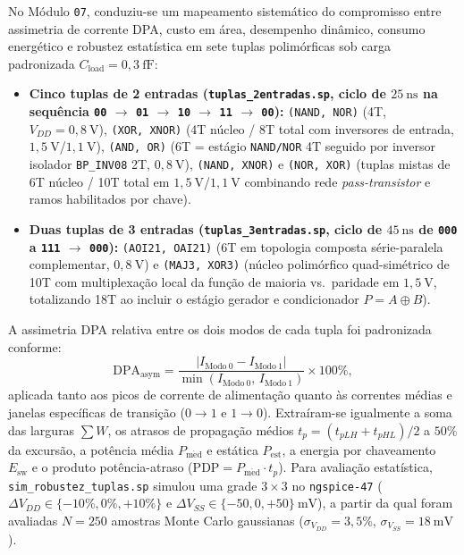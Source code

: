 No M\'{o}dulo \texttt{07}, conduziu-se um mapeamento sistem\'{a}tico do compromisso entre assimetria de corrente DPA, custo em \'{a}rea, desempenho din\^{a}mico, consumo energ\'{e}tico e robustez estat\'{i}stica em sete tuplas polim\'{o}rficas sob carga padronizada $C_{\mathrm{load}} = 0{,}3\ \text{fF}$:
\begin{itemize}
    \item \textbf{Cinco tuplas de 2 entradas (\texttt{tuplas\_\allowbreak 2entradas.sp}, ciclo de $25\ \text{ns}$ na sequ\^{e}ncia \texttt{00} $\to$ \texttt{01} $\to$ \texttt{10} $\to$ \texttt{11} $\to$ \texttt{00}):} \texttt{(NAND, NOR)} (4T, $V_{DD}=0{,}8\ \text{V}$), \texttt{(XOR, XNOR)} (4T n\'{u}cleo / 8T total com inversores de entrada, $1{,}5\ \text{V}$/$1{,}1\ \text{V}$), \texttt{(AND, OR)} (6T = est\'{a}gio \texttt{NAND/NOR} 4T seguido por inversor isolador \texttt{BP\_INV08} 2T, $0{,}8\ \text{V}$), \texttt{(NAND, XNOR)} e \texttt{(NOR, XOR)} (tuplas mistas de 6T n\'{u}cleo / 10T total em $1{,}5\ \text{V}$/$1{,}1\ \text{V}$ combinando rede \textit{pass-transistor} e ramos habilitados por chave).
    \item \textbf{Duas tuplas de 3 entradas (\texttt{tuplas\_\allowbreak 3entradas.sp}, ciclo de $45\ \text{ns}$ de \texttt{000} a \texttt{111} $\to$ \texttt{000}):} \texttt{(AOI21, OAI21)} (6T em topologia composta s\'{e}rie-paralela complementar, $0{,}8\ \text{V}$) e \texttt{(MAJ3, XOR3)} (n\'{u}cleo polim\'{o}rfico quad-sim\'{e}trico de 10T com multiplexa\c{c}\~{a}o local da fun\c{c}\~{a}o de maioria vs.\ paridade em $1{,}5\ \text{V}$, totalizando 18T ao incluir o est\'{a}gio gerador e condicionador $P = A \oplus B$).
\end{itemize}

A assimetria DPA relativa entre os dois modos de cada tupla foi padronizada conforme:
\begin{equation}\label{eq:dpa_asym}
\mathrm{DPA}_{\mathrm{asym}} = \frac{|I_{\mathrm{Modo\ 0}} - I_{\mathrm{Modo\ 1}}|}{\min(I_{\mathrm{Modo\ 0}},\, I_{\mathrm{Modo\ 1}})} \times 100\%,
\end{equation}
aplicada tanto aos picos de corrente de alimenta\c{c}\~{a}o quanto \`{a}s correntes m\'{e}dias e janelas espec\'{i}ficas de transi\c{c}\~{a}o ($0\to 1$ e $1\to 0$). Extra\'{i}ram-se igualmente a soma das larguras $\sum W$, os atrasos de propaga\c{c}\~{a}o m\'{e}dios $t_p = (t_{pLH} + t_{pHL})/2$ a $50\%$ da excurs\~{a}o, a pot\^{e}ncia m\'{e}dia $P_{\mathrm{m\acute{e}d}}$ e est\'{a}tica $P_{\mathrm{est}}$, a energia por chaveamento $E_{\mathrm{sw}}$ e o produto pot\^{e}ncia-atraso ($\mathrm{PDP} = P_{\mathrm{m\acute{e}d}} \cdot t_p$). Para avalia\c{c}\~{a}o estat\'{i}stica, \texttt{sim\_robustez\_tuplas.sp} simulou uma grade $3 \times 3$ no \texttt{ngspice-47} ($\Delta V_{DD} \in \{-10\%, 0\%, +10\%\}$ e $\Delta V_{SS} \in \{-50, 0, +50\}\ \text{mV}$), a partir da qual foram avaliadas $N = 250$ amostras Monte Carlo gaussianas ($\sigma_{V_{DD}} = 3{,}5\%$, $\sigma_{V_{SS}} = 18\ \text{mV}$).

